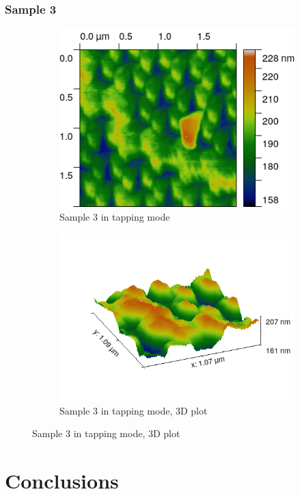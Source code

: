 \documentclass[11pt,a4paper]{article}
\begin{document}
\subsubsection{Sample 3}
\begin{figure}[H]
\centering
\begin{subfigure}[b]{0.45\textwidth}
\includegraphics[width=\textwidth]{tm_sample3}
\caption{Sample 3 in tapping mode}
\label{fig:}
\end{subfigure}
\begin{subfigure}[b]{0.45\textwidth}
\includegraphics[width=\textwidth]{tm_sample3_3D}
\caption{Sample 3 in tapping mode, 3D plot}
\label{fig:}
\end{subfigure}
\end{figure}
\section{Conclusions}


\nocite{*}
\newpage


\end{document}
